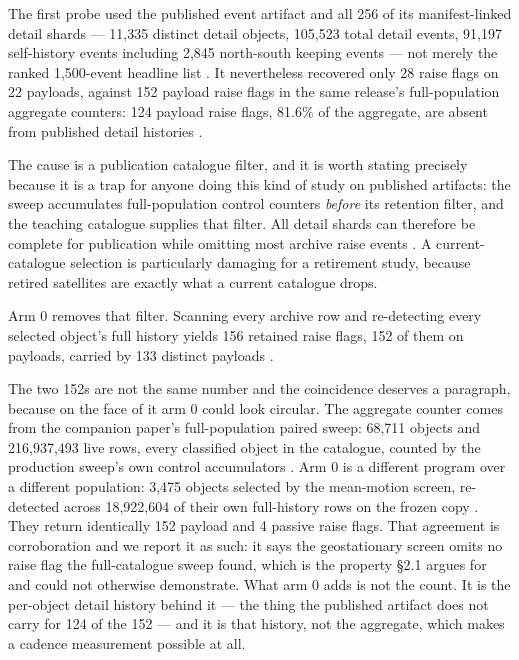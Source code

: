 \documentclass[11pt]{article}
\begin{document}
The first probe used the published event artifact and all 256 of its manifest-linked detail shards --- 11,335 distinct detail objects, 105,523 total detail events, 91,197 self-history events including 2,845 north-south keeping events --- not merely the ranked 1,500-event headline list%
. It nevertheless recovered only 28 raise flags on 22 payloads, against 152 payload raise flags in the same release's full-population aggregate counters: 124 payload raise flags, 81.6\% of the aggregate, are absent from published detail histories%
.

The cause is a publication catalogue filter, and it is worth stating precisely because it is a trap for anyone doing this kind of study on published artifacts: the sweep accumulates full-population control counters \emph{before} its retention filter, and the teaching catalogue supplies that filter. All detail shards can therefore be complete for publication while omitting most archive raise events%
. A current-catalogue selection is particularly damaging for a retirement study, because retired satellites are exactly what a current catalogue drops.

Arm 0 removes that filter. Scanning every archive row and re-detecting every selected object's full history yields 156 retained raise flags, 152 of them on payloads, carried by 133 distinct payloads%
.

The two 152s are not the same number and the coincidence deserves a paragraph, because on the face of it arm 0 could look circular. The aggregate counter comes from the companion paper's full-population paired sweep: 68,711 objects and 216,937,493 live rows, every classified object in the catalogue, counted by the production sweep's own control accumulators%
. Arm 0 is a different program over a different population: 3,475 objects selected by the mean-motion screen, re-detected across 18,922,604 of their own full-history rows on the frozen copy%
. They return identically 152 payload and 4 passive raise flags. That agreement is corroboration and we report it as such: it says the geostationary screen omits no raise flag the full-catalogue sweep found, which is the property \S{}2.1 argues for and could not otherwise demonstrate. What arm 0 adds is not the count. It is the per-object detail history behind it --- the thing the published artifact does not carry for 124 of the 152 --- and it is that history, not the aggregate, which makes a cadence measurement possible at all.
\end{document}
